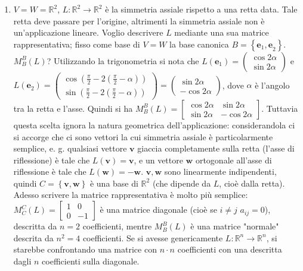 \documentclass{article}
\begin{document}
\begin{enumerate}
\item $V=W=%
\mathbb{R}
^{2}$, $L:%
\mathbb{R}
^{2}\rightarrow 
\mathbb{R}
^{2}$ \`{e} la simmetria assiale rispetto a una retta data. Tale retta deve
passare per l'origine, altrimenti la simmetria assiale non \`{e}
un'applicazione lineare. Voglio descrivere $L$ mediante una sua matrice
rappresentativa; fisso come base di $V=W$ la base canonica $B=\left\{ 
\mathbf{e}_{1}\mathbf{,e}_{2}\right\} $. $M_{B}^{B}\left( L\right) $?
Utilizzando la trigonometria si nota che $L\left( \mathbf{e}_{1}\right)
=\left( 
\begin{array}{c}
\cos 2\alpha \\ 
\sin 2\alpha%
\end{array}%
\right) $ e $L\left( \mathbf{e}_{2}\right) =\left( 
\begin{array}{c}
\cos \left( \frac{\pi }{2}-2\left( \frac{\pi }{2}-\alpha \right) \right) \\ 
\sin \left( \frac{\pi }{2}-2\left( \frac{\pi }{2}-\alpha \right) \right)%
\end{array}%
\right) =\left( 
\begin{array}{c}
\sin 2\alpha \\ 
-\cos 2\alpha%
\end{array}%
\right) $, dove $\alpha $ \`{e} l'angolo tra la retta e l'asse. Quindi si ha 
$M_{B}^{B}\left( L\right) =\left[ 
\begin{array}{cc}
\cos 2\alpha & \sin 2\alpha \\ 
\sin 2\alpha & -\cos 2\alpha%
\end{array}%
\right] $. Tuttavia questa scelta ignora la natura geometrica
dell'applicazione: considerandola ci si accorge che ci sono vettori la cui
simmetria assiale \`{e} particolarmente semplice, e. g. qualsiasi vettore $%
\mathbf{v}$ giaccia completamente sulla retta (l'asse di riflessione) \`{e}
tale che $L\left( \mathbf{v}\right) =\mathbf{v}$, e un vettore $\mathbf{w}$
ortogonale all'asse di riflessione \`{e} tale che $L\left( \mathbf{w}\right)
=\mathbf{-w}$. $\mathbf{v,w}$ sono linearmente indipendenti, quindi $%
C=\left\{ \mathbf{v,w}\right\} $ \`{e} una base di $%
\mathbb{R}
^{2}$ (che dipende da $L$, cio\`{e} dalla retta). Adesso scrivere la matrice
rappresentativa \`{e} molto pi\`{u} semplice: $M_{C}^{C}\left( L\right) =%
\left[ 
\begin{array}{cc}
1 & 0 \\ 
0 & -1%
\end{array}%
\right] $ \`{e} una matrice diagonale (cio\`{e} se $i\neq j$ $a_{ij}=0$),
descritta da $n=2$ coefficienti, mentre $M_{B}^{B}\left( L\right) $ \`{e}
una matrice "normale" descrita da $n^{2}=4$ coefficienti. Se si avesse
genericamente $L:%
\mathbb{R}
^{n}\rightarrow 
\mathbb{R}
^{n}$, si starebbe confrontando una matrice con $n\cdot n$ coefficienti con
una descritta dagli $n$ coefficienti sulla diagonale.
\end{enumerate}
\end{document}

